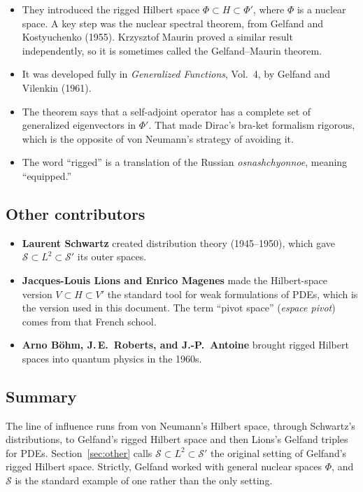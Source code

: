 \documentclass[11pt]{article}
\newcommand{\Sch}{\mathcal{S}}
\theoremstyle{definition}
\theoremstyle{plain}
\begin{document}
\begin{itemize}
  \item They introduced the rigged Hilbert space $\Phi\subset H\subset\Phi'$,
    where $\Phi$ is a nuclear space. A key step was the nuclear spectral
    theorem, from Gelfand and Kostyuchenko (1955). Krzysztof Maurin proved a
    similar result independently, so it is sometimes called the Gelfand--Maurin
    theorem.
  \item It was developed fully in \emph{Generalized Functions}, Vol.~4, by
    Gelfand and Vilenkin (1961).
  \item The theorem says that a self-adjoint operator has a complete set of
    generalized eigenvectors in $\Phi'$. That made Dirac's bra-ket formalism
    rigorous, which is the opposite of von Neumann's strategy of avoiding it.
  \item The word ``rigged'' is a translation of the Russian
    \emph{osnashchyonnoe}, meaning ``equipped.''
\end{itemize}

\subsection*{Other contributors}

\begin{itemize}
  \item \textbf{Laurent Schwartz} created distribution theory (1945--1950),
    which gave $\Sch\subset L^2\subset\Sch'$ its outer spaces.
  \item \textbf{Jacques-Louis Lions and Enrico Magenes} made the Hilbert-space
    version $V\subset H\subset V'$ the standard tool for weak formulations of
    PDEs, which is the version used in this document. The term ``pivot space''
    (\emph{espace pivot}) comes from that French school.
  \item \textbf{Arno B\"ohm, J.\,E.~Roberts, and J.-P.~Antoine} brought rigged
    Hilbert spaces into quantum physics in the 1960s.
\end{itemize}

\subsection*{Summary}

The line of influence runs from von Neumann's Hilbert space, through Schwartz's
distributions, to Gelfand's rigged Hilbert space and then Lions's Gelfand
triples for PDEs. Section~\ref{sec:other} calls $\Sch\subset L^2\subset\Sch'$
the original setting of Gelfand's rigged Hilbert space. Strictly, Gelfand worked
with general nuclear spaces $\Phi$, and $\Sch$ is the standard example of one
rather than the only setting.
\end{document}
